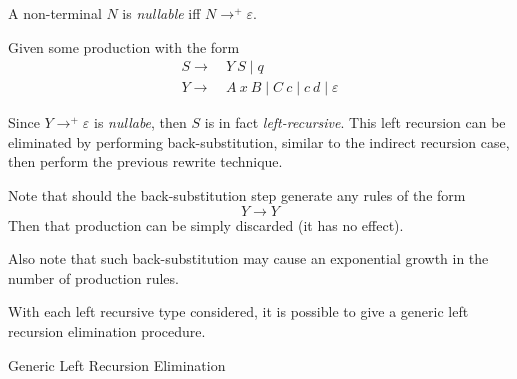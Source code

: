 \begin{definition}
    A non-terminal $N$ is \textit{nullable} iff $N \to^+ \varepsilon$.
\end{definition}

\begin{definition}
    Given some production with the form
    \begin{equation}
        \begin{aligned}
            S \to &\ Y\ S \mid q \\
            Y \to &\ A\ x\ B \mid C\ c \mid c\ d \mid \varepsilon
        \end{aligned}
    \end{equation}
    
    Since $Y \to^+ \varepsilon$ is \textit{nullabe}, then $S$ is in fact \textit{left-recursive}. This left recursion can be eliminated by performing back-substitution, similar to the indirect recursion case, then perform the previous rewrite technique.
    
    Note that should the back-substitution step generate any rules of the form
    \begin{equation}
        Y \to Y
    \end{equation}
    Then that production can be simply discarded (it has no effect).
    
    Also note that such back-substitution may cause an exponential growth in the number of production rules.
\end{definition}

\begin{definition}
    With each left recursive type considered, it is possible to give a generic left recursion elimination procedure.
    \begin{algorithm}[H]
        \begin{algorithmic}[1]
                \Repeat
            \EndProcedure
        \end{algorithmic}
        \caption{Generic Left Recursion Elimination}
        \label{prog:generic-left-recursion-elimination}
    \end{algorithm}
\end{definition}

